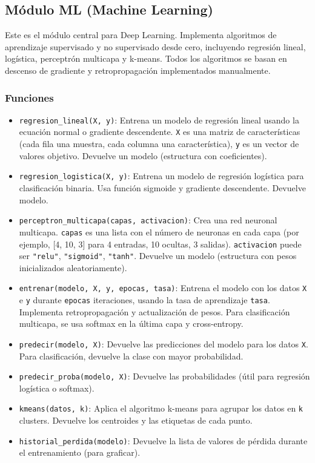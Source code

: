 \documentclass[12pt]{article}
\begin{document}
\subsection{Módulo ML (Machine Learning)}

Este es el módulo central para Deep Learning. Implementa algoritmos de aprendizaje supervisado y no supervisado desde cero, incluyendo regresión lineal, logística, perceptrón multicapa y k-means. Todos los algoritmos se basan en descenso de gradiente y retropropagación implementados manualmente.

\subsubsection*{Funciones}
\begin{itemize}
    \item \texttt{regresion\_lineal(X, y)}: Entrena un modelo de regresión lineal usando la ecuación normal o gradiente descendente. \texttt{X} es una matriz de características (cada fila una muestra, cada columna una característica), \texttt{y} es un vector de valores objetivo. Devuelve un modelo (estructura con coeficientes).
    \item \texttt{regresion\_logistica(X, y)}: Entrena un modelo de regresión logística para clasificación binaria. Usa función sigmoide y gradiente descendente. Devuelve modelo.
    \item \texttt{perceptron\_multicapa(capas, activacion)}: Crea una red neuronal multicapa. \texttt{capas} es una lista con el número de neuronas en cada capa (por ejemplo, [4, 10, 3] para 4 entradas, 10 ocultas, 3 salidas). \texttt{activacion} puede ser \texttt{"relu"}, \texttt{"sigmoid"}, \texttt{"tanh"}. Devuelve un modelo (estructura con pesos inicializados aleatoriamente).
    \item \texttt{entrenar(modelo, X, y, epocas, tasa)}: Entrena el modelo con los datos \texttt{X} e \texttt{y} durante \texttt{epocas} iteraciones, usando la tasa de aprendizaje \texttt{tasa}. Implementa retropropagación y actualización de pesos. Para clasificación multicapa, se usa softmax en la última capa y cross-entropy.
    \item \texttt{predecir(modelo, X)}: Devuelve las predicciones del modelo para los datos \texttt{X}. Para clasificación, devuelve la clase con mayor probabilidad.
    \item \texttt{predecir\_proba(modelo, X)}: Devuelve las probabilidades (útil para regresión logística o softmax).
    \item \texttt{kmeans(datos, k)}: Aplica el algoritmo k-means para agrupar los datos en \texttt{k} clusters. Devuelve los centroides y las etiquetas de cada punto.
    \item \texttt{historial\_perdida(modelo)}: Devuelve la lista de valores de pérdida durante el entrenamiento (para graficar).
\end{itemize}
\end{document}
